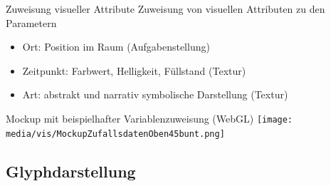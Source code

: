 \documentclass[10pt]{beamer}
\begin{document}
\begin{frame}{Zuweisung visueller Attribute}
	Zuweisung von visuellen Attributen zu den Parametern
	\begin{itemize}
		\item Ort: Position im Raum (Aufgabenstellung)
		\item Zeitpunkt: Farbwert, Helligkeit, Füllstand (Textur)
		\item Art: abstrakt und narrativ symbolische Darstellung (Textur)
	\end{itemize}
\end{frame}

%
%
\begin{frame}{Mockup mit beispielhafter Variablenzuweisung (WebGL)}
	\texttt{[image: media/vis/MockupZufallsdatenOben45bunt.png]}
\end{frame}

\subsection{Glyphdarstellung} %
\end{document}

